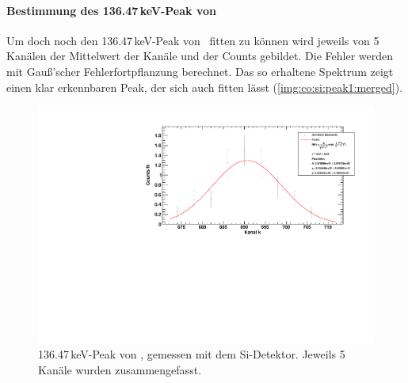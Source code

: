 \paragraph{Bestimmung des 136.47\,keV-Peak von \co}
Um doch noch den 136.47\,keV-Peak von \co\ fitten zu können wird jeweils von 5 Kanälen der Mittelwert der Kanäle und der Counts gebildet. 
Die Fehler werden mit Gauß'scher Fehlerfortpflanzung berechnet.
Das so erhaltene Spektrum zeigt einen klar erkennbaren Peak, der sich auch fitten lässt (\autoref{img:co:si:peak1:merged}).
\begin{figure}[H]
\begin{center}
  \includegraphics[width=\textwidth]{../img/part3/Co-Si_01_mergedbins.pdf}
  \caption{136.47\,keV-Peak von \co, gemessen mit dem Si-Detektor. Jeweils 5 Kanäle wurden zusammengefasst.}
  \label{img:co:si:peak1:merged}
\end{center}
\end{figure}

